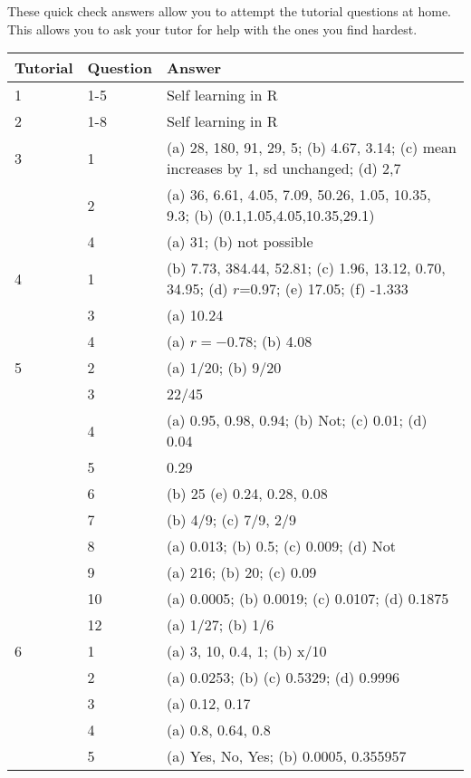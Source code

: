 \documentclass[bigtut]{tutorial}
\begin{document}

\begin{tutorial}

\begin{displaybox}
These quick check answers allow you to attempt the tutorial questions at home. \\
This allows you to ask your tutor for help with the ones you find hardest.
\end{displaybox}
\vskip -2mm



\begin{tabular}{|l |l |l |} \hline
Tutorial & Question & Answer \\ \hline
1 & 1-5 & Self learning in R \\ \hline
2 & 1-8 & Self learning in R \\ \hline
3 & 1 & (a) 28, 180, 91, 29, 5; (b) 4.67, 3.14; (c) mean increases by 1, sd unchanged; (d) 2,7 \\
  &  2 & (a) 36, 6.61, 4.05, 7.09, 50.26, 1.05, 10.35, 9.3; (b) (0.1,1.05,4.05,10.35,29.1) \\
  &  4 & (a) 31; (b) not possible \\ \hline
4 & 1 & (b) 7.73, 384.44, 52.81; (c) 1.96, 13.12, 0.70, 34.95; (d) $r$=0.97; (e) 17.05; (f) -1.333 \\
  & 3 & (a) 10.24 \\
  & 4 & (a) $r=-0.78$; (b) 4.08 \\ \hline
5 & 2 & (a) 1/20; (b) 9/20 \\
  & 3 & 22/45 \\
  & 4 & (a) 0.95, 0.98, 0.94; (b) Not; (c) 0.01; (d) 0.04 \\
  & 5 &0.29 \\
  & 6  & (b) 25 (e) 0.24, 0.28, 0.08 \\
  & 7 & (b) 4/9; (c) 7/9, 2/9 \\
  & 8 & (a)  0.013; (b) 0.5; (c) 0.009; (d) Not \\
  & 9 & (a) 216; (b) 20; (c) 0.09 \\
  & 10 & (a) 0.0005; (b) 0.0019; (c) 0.0107; (d) 0.1875 \\
  & 12 & (a) 1/27; (b) 1/6 \\ \hline
6 & 1 & (a) 3, 10, 0.4, 1; (b) x/10 \\
  & 2 & (a) 0.0253; (b) (c) 0.5329; (d) 0.9996 \\
  & 3 & (a) 0.12, 0.17 \\
  & 4 & (a) 0.8, 0.64, 0.8 \\
  & 5 & (a) Yes, No, Yes; (b) 0.0005, 0.355957 \\

\end{tabular}
\end{tutorial}
\end{document}
